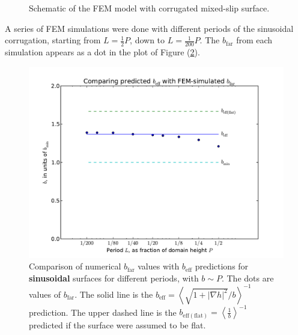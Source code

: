 \documentclass[12pt, a4paper, twoside, openright]{book}
\newcommand{\beff}{\ensuremath{b_{\mathrm{eff}}}}
\newcommand{\bfar}{\ensuremath{b_{\mathrm{far}}}}
\newcommand{\beffhf}{\ensuremath{b_{\mathrm{eff (flat)}}} = \left< \frac{1}{b} \right>^{-1} }
\newcommand{\beffha}{\ensuremath{b_{\mathrm{eff}}} = \left< \sqrt{1 + |\nabla h|^2} / {b} \right>^{-1} }
\begin{document}
\begin{figure}[ht]
\centering
{}
\caption{Schematic of the FEM model with corrugated mixed-slip surface.}\label{FEMroughmodel}
\end{figure}

A series of FEM simulations were done with different periods of the sinusoidal corrugation, starting from $L = \frac{1}{2}P$, down to $L = \frac{1}{200}P$. The $\bfar$ from each simulation appears as a dot in the plot of Figure (\ref{FEMplotsine}).

\begin{figure}[ht]
\includegraphics[scale=0.595]{Lund_Thesis_FEM_plot_sine}
\caption{Comparison of numerical $\bfar$ values with $\beff$ predictions for \textbf{sinusoidal} surfaces for different periods, with $b\sim P$. The dots are values of $\bfar$. The solid line is the  $\beffha$ prediction.  The upper dashed line is the $\beffhf$ predicted if the surface were assumed to be flat.}\label{FEMplotsine}
\end{figure}
\end{document}
